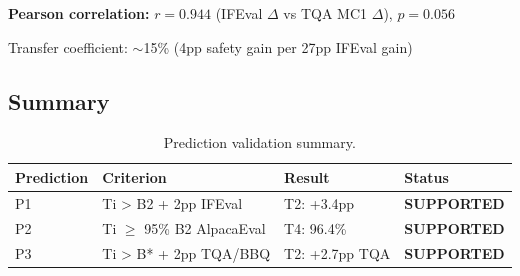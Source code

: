 \textbf{Pearson correlation:} $r = 0.944$ (IFEval $\Delta$ vs TQA MC1 $\Delta$), $p = 0.056$

Transfer coefficient: $\sim$15\% (4pp safety gain per 27pp IFEval gain)

\subsection{Summary}

\begin{table}[h]
\centering
\caption{Prediction validation summary.}
\label{tab:summary}
\begin{tabular}{@{}llll@{}}
\toprule
Prediction & Criterion & Result & Status \\
\midrule
P1 & Ti > B2 + 2pp IFEval & T2: +3.4pp & \textbf{SUPPORTED} \\
P2 & Ti $\geq$ 95\% B2 AlpacaEval & T4: 96.4\% & \textbf{SUPPORTED} \\
P3 & Ti > B* + 2pp TQA/BBQ & T2: +2.7pp TQA & \textbf{SUPPORTED} \\
\bottomrule
\end{tabular}
\end{table}
